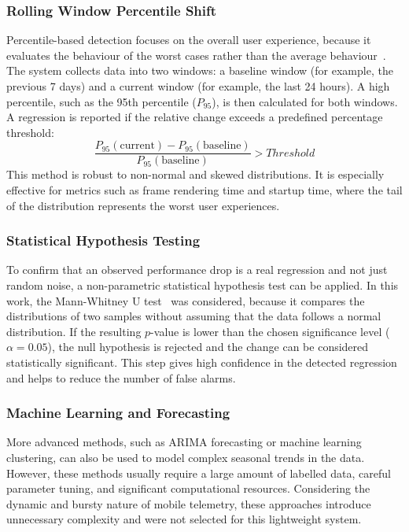 \subsubsection{Rolling Window Percentile Shift}
Percentile-based detection focuses on the overall user experience, because it evaluates the behaviour of the worst cases rather than the average behaviour~\cite{Nguyen2012}. The system collects data into two windows: a baseline window (for example, the previous 7 days) and a current window (for example, the last 24 hours). A high percentile, such as the 95th percentile ($P_{95}$), is then calculated for both windows. A regression is reported if the relative change exceeds a predefined percentage threshold:
\begin{equation}
    \frac{P_{95}(\text{current}) - P_{95}(\text{baseline})}{P_{95}(\text{baseline})} > Threshold
\end{equation}
This method is robust to non-normal and skewed distributions. It is especially effective for metrics such as frame rendering time and startup time, where the tail of the distribution represents the worst user experiences.

\subsubsection{Statistical Hypothesis Testing}
To confirm that an observed performance drop is a real regression and not just random noise, a non-parametric statistical hypothesis test can be applied. In this work, the Mann-Whitney U test~\cite{mann1947test} was considered, because it compares the distributions of two samples without assuming that the data follows a normal distribution. If the resulting $p$-value is lower than the chosen significance level ($\alpha = 0.05$), the null hypothesis is rejected and the change can be considered statistically significant. This step gives high confidence in the detected regression and helps to reduce the number of false alarms.

\subsubsection{Machine Learning and Forecasting}
More advanced methods, such as ARIMA forecasting or machine learning clustering, can also be used to model complex seasonal trends in the data. However, these methods usually require a large amount of labelled data, careful parameter tuning, and significant computational resources. Considering the dynamic and bursty nature of mobile telemetry, these approaches introduce unnecessary complexity and were not selected for this lightweight system.

